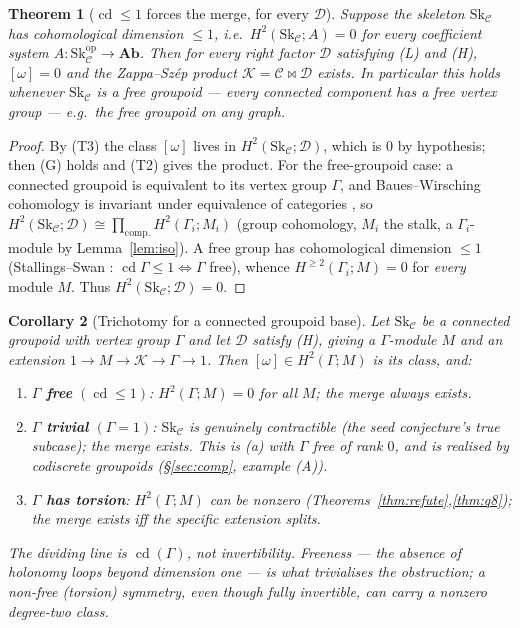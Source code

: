 \documentclass[11pt]{article}
\newtheorem{theorem}{Theorem}
\newtheorem{corollary}[theorem]{Corollary}
\theoremstyle{definition}
\newcommand{\C}{\mathcal{C}}
\newcommand{\D}{\mathcal{D}}
\newcommand{\K}{\mathcal{K}}
\newcommand{\Sk}{\mathrm{Sk}}
\newcommand{\Ab}{\mathbf{Ab}}
\newcommand{\cd}{\operatorname{cd}}
\begin{document}
\begin{theorem}[$\cd\le1$ forces the merge, for every $\D$]\label{thm:cd}
Suppose the skeleton $\Sk_\C$ has cohomological dimension $\le1$, i.e.\
$H^2(\Sk_\C;A)=0$ for every coefficient system $A:\Sk_\C^{\mathrm{op}}\to\Ab$.
Then for every right factor $\D$ satisfying \textnormal{(L)} and \textnormal{(H)},
$[\omega]=0$ and the Zappa--Sz\'ep product $\K=\C\bowtie\D$ exists.
In particular this holds whenever $\Sk_\C$ is a \emph{free groupoid} --- every
connected component has a free vertex group --- e.g.\ the free groupoid on any graph.
\end{theorem}
\begin{proof}
By \textnormal{(T3)} the class $[\omega]$ lives in $H^2(\Sk_\C;\D)$, which is $0$ by
hypothesis; then \textnormal{(G)} holds and \textnormal{(T2)} gives the product.
For the free-groupoid case: a connected groupoid is equivalent to its vertex group
$\Gamma$, and Baues--Wirsching cohomology is invariant under equivalence of
categories \cite{bw}, so $H^2(\Sk_\C;\D)\cong\prod_{\text{comp.}}H^2(\Gamma_i;M_i)$
(group cohomology, $M_i$ the stalk, a $\Gamma_i$-module by Lemma~\ref{lem:iso}). A
free group has cohomological dimension $\le1$ (Stallings--Swan
\cite{stallings,swan}: $\cd\Gamma\le1\iff\Gamma$ free), whence
$H^{\ge2}(\Gamma_i;M)=0$ for \emph{every} module $M$. Thus $H^2(\Sk_\C;\D)=0$.
\end{proof}

\begin{corollary}[Trichotomy for a connected groupoid base]\label{cor:trichotomy}
Let $\Sk_\C$ be a connected groupoid with vertex group $\Gamma$ and let $\D$ satisfy
\textnormal{(H)}, giving a $\Gamma$-module $M$ and an extension
$1\to M\to\K\to\Gamma\to1$. Then $[\omega]\in H^2(\Gamma;M)$ is its class, and:
\begin{enumerate}
\item[\textnormal{(a)}] \textbf{$\Gamma$ free} $(\cd\le1)$: $H^2(\Gamma;M)=0$ for
all $M$; the merge \emph{always} exists.
\item[\textnormal{(b)}] \textbf{$\Gamma$ trivial} $(\Gamma=1)$: $\Sk_\C$ is
genuinely contractible (the seed conjecture's true subcase); the merge exists. This
is (a) with $\Gamma$ free of rank $0$, and is realised by codiscrete groupoids
(\S\ref{sec:comp}, example (A)).
\item[\textnormal{(c)}] \textbf{$\Gamma$ has torsion}: $H^2(\Gamma;M)$ can be
nonzero (Theorems~\ref{thm:refute},\ref{thm:q8}); the merge exists iff the specific
extension splits.
\end{enumerate}
The dividing line is $\cd(\Gamma)$, not invertibility. Freeness --- the absence of
holonomy loops beyond dimension one --- is what trivialises the obstruction; a
non-free (torsion) symmetry, even though fully invertible, can carry a nonzero
degree-two class.
\end{corollary}
\end{document}
